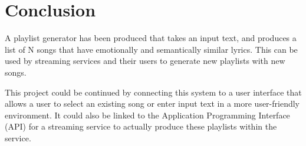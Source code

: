 \documentclass[11pt]{article}
\begin{document}
\section{Conclusion}

A playlist generator has been produced that takes an input text, and produces a list of N songs that have emotionally and semantically similar lyrics. This can be used by streaming services and their users to generate new playlists with new songs.

This project could be continued by connecting this system to a user interface that allows a user to select an existing song or enter input text in a more user-friendly environment. It could also be linked to the Application Programming Interface (API) for a streaming service to actually produce these playlists within the service.



\end{document}
